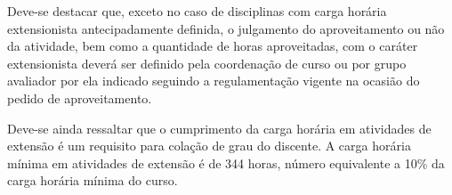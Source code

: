 Deve-se destacar que, exceto no caso de disciplinas com carga horária
extensionista antecipadamente definida, o julgamento do aproveitamento
ou não da atividade, bem como a quantidade de horas aproveitadas, com
o caráter extensionista deverá ser definido pela coordenação de curso
ou por grupo avaliador por ela indicado seguindo a regulamentação
vigente na ocasião do pedido de aproveitamento.

Deve-se ainda ressaltar que o cumprimento da carga horária em
atividades de extensão é um requisito para colação de grau do
discente. A carga horária mínima em atividades de extensão é de 344
horas, número equivalente a 10\% da carga horária mínima do curso.
